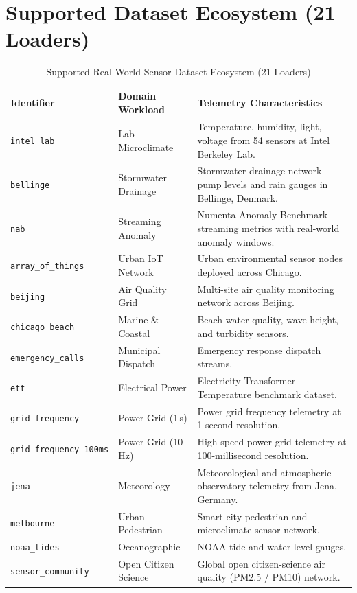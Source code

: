 \documentclass[10pt,a4paper]{report}
\begin{document}
\section{Supported Dataset Ecosystem (21 Loaders)}
\begin{table}[htbp]
\centering
\scriptsize
\caption{Supported Real-World Sensor Dataset Ecosystem (21 Loaders)}
\label{tab:datasets}
\begin{tabularx}{\textwidth}{llX}
\toprule
\textbf{Identifier} & \textbf{Domain Workload} & \textbf{Telemetry Characteristics} \\
\midrule
\texttt{intel\_lab} & Lab Microclimate & Temperature, humidity, light, voltage from 54 sensors at Intel Berkeley Lab. \\
\texttt{bellinge} & Stormwater Drainage & Stormwater drainage network pump levels and rain gauges in Bellinge, Denmark. \\
\texttt{nab} & Streaming Anomaly & Numenta Anomaly Benchmark streaming metrics with real-world anomaly windows. \\
\texttt{array\_of\_things} & Urban IoT Network & Urban environmental sensor nodes deployed across Chicago. \\
\texttt{beijing} & Air Quality Grid & Multi-site air quality monitoring network across Beijing. \\
\texttt{chicago\_beach} & Marine \& Coastal & Beach water quality, wave height, and turbidity sensors. \\
\texttt{emergency\_calls} & Municipal Dispatch & Emergency response dispatch streams. \\
\texttt{ett} & Electrical Power & Electricity Transformer Temperature benchmark dataset. \\
\texttt{grid\_frequency} & Power Grid (1\,s) & Power grid frequency telemetry at 1-second resolution. \\
\texttt{grid\_frequency\_100ms} & Power Grid (10\,Hz) & High-speed power grid telemetry at 100-millisecond resolution. \\
\texttt{jena} & Meteorology & Meteorological and atmospheric observatory telemetry from Jena, Germany. \\
\texttt{melbourne} & Urban Pedestrian & Smart city pedestrian and microclimate sensor network. \\
\texttt{noaa\_tides} & Oceanographic & NOAA tide and water level gauges. \\
\texttt{sensor\_community} & Open Citizen Science & Global open citizen-science air quality (PM2.5 / PM10) network. \\

\end{tabularx}
\end{table}
\end{document}
